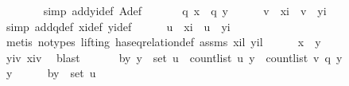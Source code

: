 \begin{isabellebody}
\ \ \ \ \ \ \isamarkupfalse%
\ {\isacharparenleft}{\kern0pt}simp\ add{\isacharcolon}{\kern0pt}yi{\isacharunderscore}{\kern0pt}def\ A{\isacharunderscore}{\kern0pt}def{\isacharparenright}{\kern0pt}\ \isanewline
\isanewline
\ \ \ \ \isamarkupfalse%
\ {\isachardoublequoteopen}q\ x\ {\isacharequal}{\kern0pt}\ q\ y{\isachardoublequoteclose}\isanewline
\ \ \ \ \isamarkupfalse%
\ {\isachardoublequoteopen}v\ {\isacharbang}{\kern0pt}\ xi\ {\isacharequal}{\kern0pt}\ v\ {\isacharbang}{\kern0pt}\ yi{\isachardoublequoteclose}\isanewline
\ \ \ \ \ \ \isamarkupfalse%
\ {\isacharparenleft}{\kern0pt}simp\ add{\isacharcolon}{\kern0pt}q{\isacharunderscore}{\kern0pt}def\ xi{\isacharunderscore}{\kern0pt}def\ yi{\isacharunderscore}{\kern0pt}def{\isacharparenright}{\kern0pt}\isanewline
\ \ \ \ \isamarkupfalse%
\ {\isachardoublequoteopen}u\ {\isacharbang}{\kern0pt}\ xi\ {\isacharequal}{\kern0pt}\ u\ {\isacharbang}{\kern0pt}\ yi{\isachardoublequoteclose}\isanewline
\ \ \ \ \ \ \isamarkupfalse%
\ {\isacharparenleft}{\kern0pt}metis\ {\isacharparenleft}{\kern0pt}no{\isacharunderscore}{\kern0pt}types{\isacharcomma}{\kern0pt}\ lifting{\isacharparenright}{\kern0pt}\ has{\isacharunderscore}{\kern0pt}eq{\isacharunderscore}{\kern0pt}relation{\isacharunderscore}{\kern0pt}def\ assms{\isacharparenleft}{\kern0pt}{}{\isacharparenright}{\kern0pt}\ xi{\isacharunderscore}{\kern0pt}l\ yi{\isacharunderscore}{\kern0pt}l{\isacharparenright}{\kern0pt}\isanewline
\ \ \ \ \isamarkupfalse%
\ {\isachardoublequoteopen}x\ {\isacharequal}{\kern0pt}\ y{\isachardoublequoteclose}\isanewline
\ \ \ \ \ \ \isamarkupfalse%
\ yi{\isacharunderscore}{\kern0pt}v\ xi{\isacharunderscore}{\kern0pt}v\ \isamarkupfalse%
\ blast\isanewline
\ \ \isamarkupfalse%
\isanewline
\isanewline
\ \ \isamarkupfalse%
\ b{\isacharcolon}{\kern0pt}{\isachardoublequoteopen}{\isasymAnd}y{\isachardot}{\kern0pt}\ y\ {\isasymin}\ set\ u\ {\isasymLongrightarrow}\ count{\isacharunderscore}{\kern0pt}list\ u\ y\ {\isacharequal}{\kern0pt}\ count{\isacharunderscore}{\kern0pt}list\ v\ {\isacharparenleft}{\kern0pt}q\ y{\isacharparenright}{\kern0pt}{\isachardoublequoteclose}\isanewline
\ \ \isamarkupfalse%
\ {\isacharminus}{\kern0pt}\isanewline
\ \ \ \ \isamarkupfalse%
\ y\isanewline
\ \ \ \ \isamarkupfalse%
\ b{\isacharunderscore}{\kern0pt}{}{\isacharcolon}{\kern0pt}{\isachardoublequoteopen}y\ {\isasymin}\ set\ u{\isachardoublequoteclose}\isanewline

\end{isabellebody}
